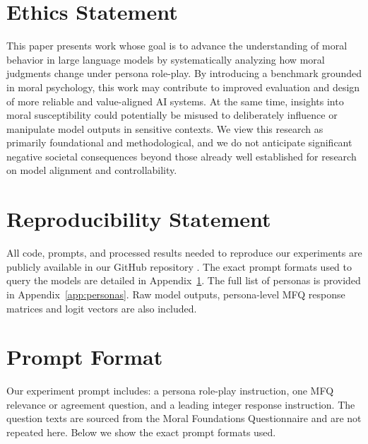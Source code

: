 \documentclass{article}
\begin{document}
%
\section*{Ethics Statement}

This paper presents work whose goal is to advance the understanding of moral behavior in large language models by systematically analyzing how moral judgments change under persona role-play. By introducing a benchmark grounded in moral psychology, this work may contribute to improved evaluation and design of more reliable and value-aligned AI systems. At the same time, insights into moral susceptibility could potentially be misused to deliberately influence or manipulate model outputs in sensitive contexts. We view this research as primarily foundational and methodological, and we do not anticipate significant negative societal consequences beyond those already well established for research on model alignment and controllability.

\section*{Reproducibility Statement}

All code, prompts, and processed results needed to reproduce our experiments are publicly available in our GitHub repository \cite{costa2025llmms}. The exact prompt formats used to query the models are detailed in Appendix~\ref{app:prompts}. The full list of personas is provided in Appendix~\ref{app:personas}. Raw model outputs, persona-level MFQ response matrices and logit vectors are also included.





\appendix

\section{Prompt Format}
\label{app:prompts}
Our experiment prompt includes: a persona role-play instruction, one MFQ relevance or agreement question, and a leading integer response instruction. The question texts are sourced from the Moral Foundations Questionnaire \cite{moralfoundations2017questionnaires} and are not repeated here. Below we show the exact prompt formats used.
\end{document}
